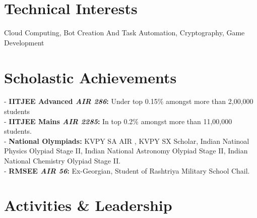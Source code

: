 \documentclass[a4paper,10pt]{extarticle} %
\begin{document}
\section{\textcolor{primary}{Technical Interests}}

\noindent Cloud Computing, Bot Creation And Task Automation, Cryptography, Game Development \\


\vspace{-0.3cm}
\section{\textcolor{primary}{Scholastic Achievements}}

- \textbf{IITJEE Advanced \emph{AIR 286}:} Under top 0.15\% amongst more than 2,00,000 students \\
- \textbf{IITJEE Mains \emph{AIR 2285}:} In top 0.2\% amongst more than 11,00,000 students. \\
- \textbf{National Olympiads:} KVPY SA AIR , KVPY SX Scholar, Indian Natinoal Physics Olypiad Stage II, Indian National Astronomy Olypiad Stage II, Indian National Chemistry Olypiad Stage II. \\
- \textbf{RMSEE \emph{AIR 56}:} Ex-Georgian, Student of Rashtriya Military School Chail. \\




\vspace{-0.3cm}
\section{\textcolor{primary}{Activities \& Leadership}}
\end{document}
